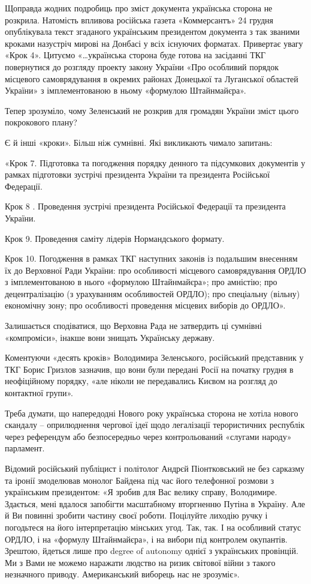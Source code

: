 Щоправда жодних подробиць про зміст документа українська сторона не розкрила.
Натомість впливова російська газета «Коммерсантъ» 24 грудня опублікувала текст
згаданого українським президентом документа з так званими кроками назустріч
мирові на Донбасі у всіх існуючих форматах. Привертає увагу «Крок 4». Цитуємо
«…українська сторона буде готова на засіданні ТКГ повернутися до розгляду
проекту закону України «Про особливий порядок місцевого самоврядування в
окремих районах Донецької та Луганської областей України» з імплементованою в
ньому «формулою Штайнмайєра».

Тепер зрозуміло, чому Зеленський не розкрив для громадян України зміст цього
покрокового плану?

Є й інші «кроки». Більш ніж сумнівні. Які викликають чимало запитань:

«Крок 7. Підготовка та погодження порядку денного та підсумкових документів у
рамках підготовки зустрічі президента України та президента Російської
Федерації.

Крок 8 . Проведення зустрічі президента Російської Федерації та президента
України.

Крок 9. Проведення саміту лідерів Нормандського формату.

Крок 10. Погодження в рамках ТКГ наступних законів із подальшим внесенням їх до
Верховної Ради України: про особливості місцевого самоврядування ОРДЛО з
імплементованою в нього «формулою Штайнмайєра»; про амністію; про
децентралізацію (з урахуванням особливостей ОРДЛО); про спеціальну (вільну)
економічну зону; про особливості проведення місцевих виборів до ОРДЛО».

Залишається сподіватися, що Верховна Рада не затвердить ці сумнівні
«компроміси», інакше вони знищать Українську державу.

Коментуючи «десять кроків» Володимира Зеленського, російський представник у ТКГ
Борис Гризлов зазначив, що вони були передані Росії на початку грудня в
неофіційному порядку, «але ніколи не передавались Києвом на розгляд до
контактної групи».

Треба думати, що напередодні Нового року українська сторона не хотіла нового
скандалу – оприлюднення чергової ідеї щодо легалізації терористичних республік
через референдум або безпосередньо через контрольований «слугами народу»
парламент.

Відомий російський публіцист і політолог Андрєй Піонтковський не без сарказму
та іронії змоделював монолог Байдена під час його телефонної розмови з
українським президентом: «Я зробив для Вас велику справу, Володимире. Здається,
мені вдалося запобігти масштабному вторгненню Путіна в Україну. Але й Ви
повинні зробити частину своєї роботи. Поцілуйте лиходію ручку і погодьтеся на
його інтерпретацію мінських угод. Так, так. І на особливий статус ОРДЛО, і на
«формулу Штайнмайєра», і на вибори під контролем окупантів. Зрештою, йдеться
лише про degree of autonomy однієї з українських провінцій. Ми з Вами не можемо
наражати людство на ризик світової війни з такого незначного приводу.
Американський виборець нас не зрозуміє».

